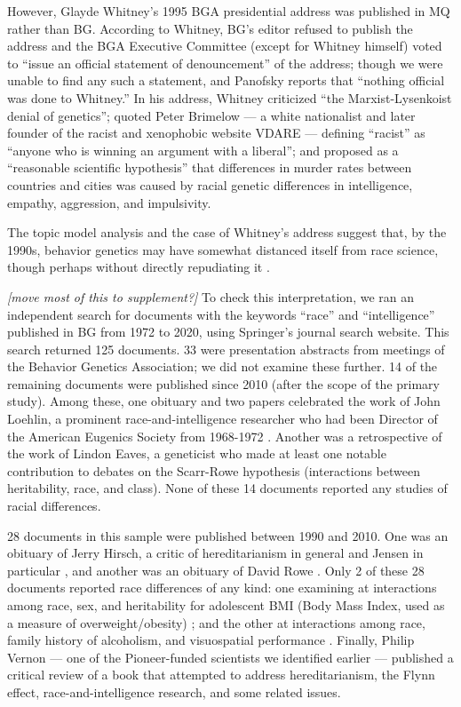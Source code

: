 \documentclass[12pt]{article}
\begin{document}
However, Glayde Whitney's 1995 BGA presidential address was published in MQ rather than BG. According to Whitney, BG's editor refused to publish the address and the BGA Executive Committee (except for Whitney himself) voted to ``issue an official statement of denouncement'' of the address; though we were unable to find any such a statement, and Panofsky reports that ``nothing official was done to Whitney.'' In his address, Whitney criticized ``the Marxist-Lysenkoist denial of genetics''; quoted Peter Brimelow --- a white nationalist and later founder of the racist and xenophobic website VDARE --- defining ``racist'' as ``anyone who is winning an argument with a liberal''; and proposed as a ``reasonable scientific hypothesis'' that differences in murder rates between countries and cities was caused by racial genetic differences in intelligence, empathy, aggression, and impulsivity.

The topic model analysis and the case of Whitney's address suggest that, by the 1990s, behavior genetics may have somewhat distanced itself from race science, though perhaps without directly repudiating it \cite{GillbornSoftlySoftlyGenetics2016, HennWhyDNANo2021}.

\emph{{[}move most of this to supplement?{]}}
To check this interpretation, we ran an independent search for documents with the keywords ``race'' and ``intelligence'' published in BG from 1972 to 2020, using Springer's journal search website. This search returned 125 documents. 33 were presentation abstracts from meetings of the Behavior Genetics Association; we did not examine these further. 14 of the remaining documents were published since 2010 (after the scope of the primary study). Among these, one obituary and two papers celebrated the work of John Loehlin, a prominent race-and-intelligence researcher who had been Director of the American Eugenics Society from 1968-1972 \cite{JohnLoehlin19262020, WaldmanIntroductionFestschriftJohn2014, PlominGenotypeEnvironmentCorrelationEra2014}. Another was a retrospective of the work of Lindon Eaves, a geneticist who made at least one notable contribution to debates on the Scarr-Rowe hypothesis (interactions between heritability, race, and class). None of these 14 documents reported any studies of racial differences.

28 documents in this sample were published between 1990 and 2010. One was an obituary of Jerry Hirsch, a critic of hereditarianism in general and Jensen in particular \cite{RoubertouxJerryHirsch202008}, and another was an obituary of David Rowe \cite{RodgersObituaryDavidChristian2003}. Only 2 of these 28 documents reported race differences of any kind: one examining at interactions among race, sex, and heritability for adolescent BMI (Body Mass Index, used as a measure of overweight/obesity) \cite{JacobsonGeneticSharedEnvironmental1998}; and the other at interactions among race, family history of alcoholism, and visuospatial performance \cite{BermanReducedVisuospatialPerformance1995}. Finally, Philip Vernon --- one of the Pioneer-funded scientists we identified earlier --- published a critical review of a book that attempted to address hereditarianism, the Flynn effect, race-and-intelligence research, and some related issues.
\end{document}
